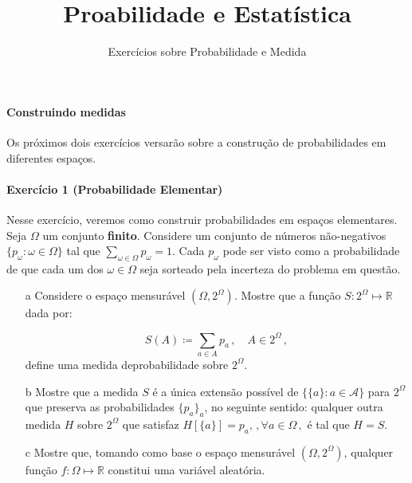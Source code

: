\documentclass[10pt,a4paper]{article}
\title{\large Proabilidade e Estatística}
\author{\normalsize Exercícios sobre Probabilidade e Medida}
\date{}
\begin{document}
	\maketitle
	\paragraph{Construindo medidas} Os próximos dois exercícios versarão sobre a construção de probabilidades em diferentes espaços.
	
	\paragraph{Exercício 1 (Probabilidade Elementar)} Nesse exercício, veremos como construir probabilidades em espaços elementares. Seja $\Omega$ um conjunto \textbf{finito}. Considere um conjunto de números não-negativos $\{p_\omega: \omega \in \Omega\}$ tal que $\sum_{\omega \in \Omega} p_\omega = 1$. Cada $p_\omega$ pode ser visto como a probabilidade de que cada um dos $\omega \in \Omega$ seja sorteado pela incerteza do problema em questão.
	
	\begin{enumerate}
		\item[a] Considere o espaço mensurável $(\Omega, 2^\Omega)$. Mostre que a função $S: 2^\Omega \mapsto \mathbb{R}$ dada por:
		
		$$S(A) \coloneqq \sum_{a \in A} p_a\, , \quad A \in 2^\Omega\, ,$$
		define uma medida deprobabilidade sobre $2^\Omega$.
				\item[b] Mostre que a medida $S$ é a única extensão possível de $\{\{a\}:a \in \mathcal{A}\}$ para $2^\Omega$ que preserva as probabilidades $\{p_a\}_a$, no seguinte sentido: qualquer outra medida $H$ sobre $2^\Omega$ que satisfaz
				$H[\{a\}] = p_a,\, , \forall a \in \Omega\,,$
				é tal que $H=S$.
				
		\item[c] Mostre que, tomando como base o espaço mensurável $(\Omega, 2^\Omega)$, qualquer função $f: \Omega \mapsto \mathbb{R}$ constitui uma variável aleatória.
	\end{enumerate}
	
\end{document}
